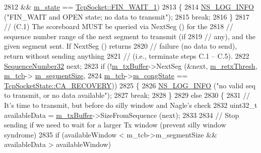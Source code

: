\begin{DoxyCode}
2812           && \hyperlink{classns3_1_1TcpSocketBase_a5db6f29272f23546e23320c06a681f3e}{m\_state} == \hyperlink{group__tcp_gga3929cdb47bdf159657fa24054aa5ca03a9f54edeb0f23302ae1c36d433b587b02}{TcpSocket::FIN\_WAIT\_1})
2813         \{
2814           \hyperlink{group__logging_gafbd73ee2cf9f26b319f49086d8e860fb}{NS\_LOG\_INFO} (\textcolor{stringliteral}{"FIN\_WAIT and OPEN state; no data to transmit"});
2815           \textcolor{keywordflow}{break};
2816         \}
2817       \textcolor{comment}{// (C.1) The scoreboard MUST be queried via NextSeg () for the}
2818       \textcolor{comment}{//       sequence number range of the next segment to transmit (if}
2819       \textcolor{comment}{//       any), and the given segment sent.  If NextSeg () returns}
2820       \textcolor{comment}{//       failure (no data to send), return without sending anything}
2821       \textcolor{comment}{//       (i.e., terminate steps C.1 -- C.5).}
2822       \hyperlink{group__network_gacb2070e4e98d2d5135c9bede58f07a03}{SequenceNumber32} next;
2823       \textcolor{keywordflow}{if} (!\hyperlink{classns3_1_1TcpSocketBase_a4a1b53982ffd851bd07ab8d5005c130e}{m\_txBuffer}->NextSeg (&next, \hyperlink{classns3_1_1TcpSocketBase_aea5678454b966c263c6f72f174e6e328}{m\_retxThresh}, \hyperlink{classns3_1_1TcpSocketBase_a26bbaf59001308dc43fb630d76f2e38b}{m\_tcb}->
      \hyperlink{classns3_1_1TcpSocketState_a079872f7b0099ef5f3cab4ff47bd2edd}{m\_segmentSize},
2824                                 \hyperlink{classns3_1_1TcpSocketBase_a26bbaf59001308dc43fb630d76f2e38b}{m\_tcb}->\hyperlink{classns3_1_1TcpSocketState_a4053e1eb120c572d0881b04620b52c30}{m\_congState} == 
      \hyperlink{classns3_1_1TcpSocketState_a6fc313945a33d48fd60cbffe0c787b19a092ee3d215c587170a751974dac5f663}{TcpSocketState::CA\_RECOVERY}))
2825         \{
2826           \hyperlink{group__logging_gafbd73ee2cf9f26b319f49086d8e860fb}{NS\_LOG\_INFO} (\textcolor{stringliteral}{"no valid seq to transmit, or no data available"});
2827           \textcolor{keywordflow}{break};
2828         \}
2829       \textcolor{keywordflow}{else}
2830         \{
2831           \textcolor{comment}{// It's time to transmit, but before do silly window and Nagle's check}
2832           uint32\_t availableData = \hyperlink{classns3_1_1TcpSocketBase_a4a1b53982ffd851bd07ab8d5005c130e}{m\_txBuffer}->SizeFromSequence (next);
2833 
2834           \textcolor{comment}{// Stop sending if we need to wait for a larger Tx window (prevent silly window syndrome)}
2835           \textcolor{keywordflow}{if} (availableWindow < m\_tcb->m\_segmentSize &&  availableData > availableWindow)

\end{DoxyCode}
